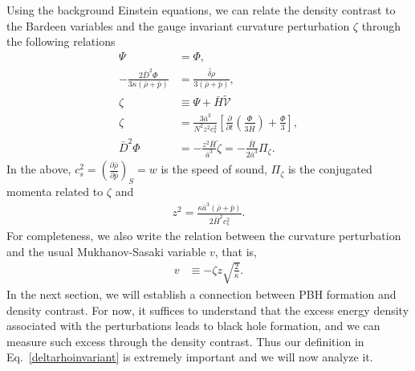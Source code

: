 \documentclass[a4paper,11pt]{article}
\newcommand{\dpar}[1]{\left(#1 \right)}
\begin{document}
Using the background Einstein equations, we can relate the density contrast to the
Bardeen variables and the gauge invariant curvature perturbation $\zeta$ through the
following relations~\cite{Mukhanov1992, Vitenti2013}
\begin{align}
	\Psi                                                    & =\Phi,
	\\
	\label{deltarho}
	-\frac{2\bar{D}^2 \Phi}{3  \kappa (\bar{\rho}+\bar{p})} & =   \frac{{\tilde{\delta\rho}}} {3(\bar{\rho}+\bar{p})}
	,
	\\
	\label{vrelation}
	\zeta                                                   & \equiv \Psi  + \bar{H} \tilde{\mathcal{V}}
	\\
	\label{zeta2}
	\zeta                                                   & = \frac{3  \bar{a}^3}{N^2z^2 c_s^2 } \left[\frac{\partial}{\partial t}\left(\frac{\Phi }{3\bar{H}}\right) + \frac{\Phi}{3}\right]
	,                                                                                                                                                                                           \\
	\label{phiz}
	\bar{D}^{2} \Phi                                        & =  - \frac{z^2\bar{H}}{\bar{a}^3} \dot{\zeta} = -\frac{\bar{H}}{2\bar{a}^3} \Pi_\zeta
	.\end{align}
In the above, $c^{2}_s=\dpar{ \frac{\partial\bar{\rho}}{\partial\bar{p}} }_{S}= w$ is
the speed of sound, $\Pi_\zeta$ is the conjugated momenta related to $\zeta$ and
\begin{align}
	\label{zdef}
	z^2=\frac{\kappa \bar{a}^3 (\bar{\rho} + \bar{p})}{2\bar{H}^2 c_{s}^2}.
\end{align}
For completeness, we also write the relation between the curvature perturbation and the
usual Mukhanov-Sasaki variable $v$, that is,
\begin{align}
	\label{msv}
	v & \equiv - \zeta z \sqrt{\frac{2}{\kappa}}
	.\end{align}
In the next section, we will establish a connection between PBH formation and density contrast. For now, it suffices to understand that the excess energy density associated with the perturbations leads to black hole formation, and we can measure such excess through the density contrast. Thus our definition in Eq.~\eqref{deltarhoinvariant} is extremely important and we will now analyze it.
\end{document}
